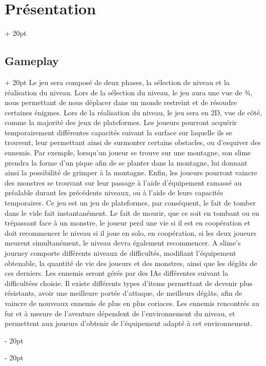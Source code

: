 \documentclass[a4paper, 12pt, twoside]{article}
\newcommand{\ind}[1][20pt]{\advance\leftskip + #1}
\newcommand{\deind}[1][20pt]{\advance\leftskip - #1}
\newenvironment{indt}[2][20pt]{#2 \par \ind[#1]}{\par \deind} %
\begin{document}
\begin{indt}{\section{Présentation}}
        \begin{indt}{\subsection{Gameplay}}
            Le jeu sera composé de deux phases, la sélection de niveau et la réalisation du niveau. Lors de la sélection du niveau, le jeu aura une vue de ¾, nous permettant de nous déplacer dans un monde restreint et de résoudre certaines énigmes. Lors de la réalisation du niveau, le jeu sera en 2D, vue de côté, comme la majorité des jeux de plateformes. Les joueurs pourront acquérir temporairement différentes capacités suivant la surface sur laquelle ils se trouvent, leur permettant ainsi de surmonter certains obstacles, ou d'esquiver des ennemis. Par exemple, lorsqu'un joueur se trouve sur une montagne, son slime prendra la forme d'un pique afin de se planter dans la montagne, lui donnant ainsi la possibilité de grimper à la montagne. Enfin, les joueurs pourront vaincre des monstres se trouvant sur leur passage à l'aide d'équipement ramassé au préalable durant les précédents niveaux, ou à l'aide de leurs capacités temporaires. Ce jeu est un jeu de plateformes, par conséquent, le fait de tomber dans le vide fait instantanément. Le fait de mourir, que ce soit en tombant ou en trépassant face à un monstre, le joueur perd une vie si il est en coopération et doit recommencer le niveau si il joue en solo, en coopération, si les deux joueurs meurent simultanément, le niveau devra également recommencer. A slime's journey comporte différents niveaux de difficultés, modifiant l'équipement obtenable, la quantité de vie des joueurs et des monstres, ainsi que les dégâts de ces derniers. Les ennemis seront gérés par des IAs différentes suivant la difficultées choisie. Il existe différents types d'items permettant de devenir plus résistants, avoir une meilleure portée d'attaque, de meilleurs dégâts, afin de vaincre de nouveaux ennemis de plus en plus coriaces. Les ennemis rencontrés au fur et à mesure de l'aventure dépendent de l'environnement du niveau, et permettent aux joueurs d'obtenir de l'équipement adapté à cet environnement.
        \end{indt}
    \end{indt}
\end{document}

